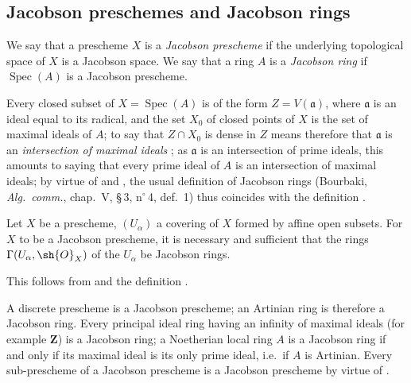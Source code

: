 \subsection{Jacobson preschemes and Jacobson rings}
\label{subsection:IV.10.4}

\begin{definition}[10.4.1]
\label{IV.10.4.1}
We say that a prescheme $X$ is a \emph{Jacobson prescheme} if the underlying topological space of $X$ is a Jacobson space.
We say that a ring $A$ is a \emph{Jacobson ring} if $\operatorname{Spec}(A)$ is a Jacobson prescheme.
\end{definition}

Every closed subset of $X=\operatorname{Spec}(A)$ is of the form $Z=V(\mathfrak{a})$, where $\mathfrak{a}$ is an ideal equal to its radical, and the set $X_0$ of closed points of $X$ is the set of maximal ideals of $A$; to say that $Z\cap X_0$ is dense in $Z$ means therefore that $\mathfrak{a}$ is an \emph{intersection of maximal ideals} ; as $\mathfrak{a}$ is an intersection of prime ideals, this amounts to saying that every prime ideal of $A$ is an intersection of maximal ideals; by virtue of  and , the usual definition of Jacobson rings (Bourbaki, \emph{Alg.\ comm.}, chap.~V, \S\,3, n$^\circ$\,4, def.~1) thus coincides with the definition .

\begin{proposition}[10.4.2]
\label{IV.10.4.2}
Let $X$ be a prescheme, $(U_\alpha)$ a covering of $X$ formed by affine open subsets.
For $X$ to be a Jacobson prescheme, it is necessary and sufficient that the rings $\Gamma(U_\alpha,\sh{O}_X)$ of the $U_\alpha$ be Jacobson rings.
\end{proposition}

This follows from  and the definition .

\begin{env}[10.4.3]
\label{IV.10.4.3}
A discrete prescheme is a Jacobson prescheme; an Artinian ring is therefore a Jacobson ring.
Every principal ideal ring having an infinity of maximal ideals (for example $\mathbf{Z}$) is a Jacobson ring; a Noetherian local ring $A$ is a Jacobson ring if and only if its maximal ideal is its only prime ideal, i.e.\ if $A$ is Artinian.
Every sub-prescheme of a Jacobson prescheme is a Jacobson prescheme by virtue of .
\end{env}


